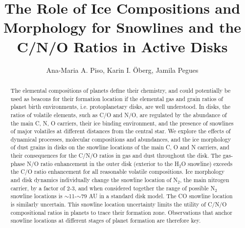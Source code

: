 \documentclass[apj]{emulateapj}
\begin{document}


\title{The Role of Ice Compositions and Morphology for Snowlines and the C/N/O Ratios in Active Disks}

\author{Ana-Maria A. Piso, Karin I. \"Oberg, Jamila Pegues}


\begin{abstract}
The elemental compositions of planets define their chemistry, and could potentially be used as beacons for their formation location if the elemental gas and grain ratios of planet birth environments, i.e. protoplanetary disks, are well understood. In disks, the ratios of volatile elements, such as C/O and N/O, are regulated by the abundance of the main C, N, O carriers, their ice binding environment, and the presence of snowlines of major volatiles at different distances from the central star. We explore the effects of dynamical processes, molecular compositions and abundances, and the ice morphology of dust grains in disks on the snowline locations of the main C, O and N carriers, and their consequences for the C/N/O ratios in gas and dust throughout the disk. 
The gas-phase N/O ratio enhancement in the outer disk (exterior to the H$_2$O snowline) exceeds the C/O ratio enhancement for all reasonable volatile compositions. Ice morphology and disk dynamics individually change the snowline location of N$_2$, the main nitrogen carrier, by a factor of 2-3, and when considered together the range of possible N$_2$ snowline locations is $\sim$11-$\sim$79 AU in a standard disk model. The CO snowline location is similarly uncertain. This snowline location uncertainty limits the utility of C/N/O compositional ratios in planets to trace their formation zone. Observations that anchor snowline locations at different stages of planet formation are therefore key. 



\end{abstract}
\end{document}
